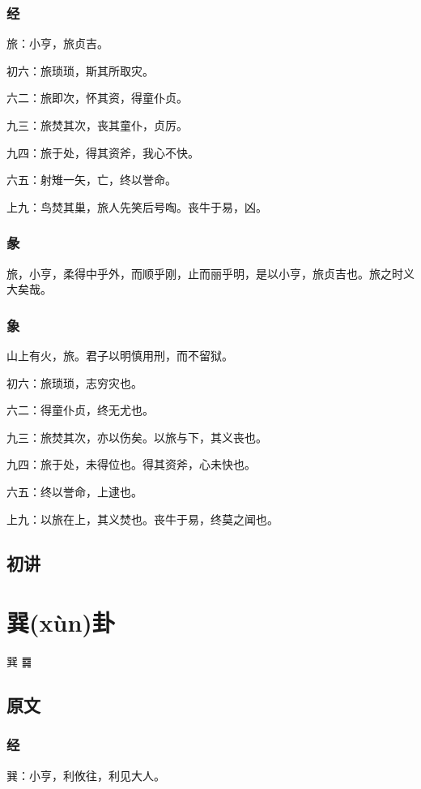\documentclass[12pt,oneside]{book}
\begin{document}
\subsection{经}
旅：小亨，旅贞吉。

初六：旅琐琐，斯其所取灾。

六二：旅即次，怀其资，得童仆贞。

九三：旅焚其次，丧其童仆，贞厉。

九四：旅于处，得其资斧，我心不快。

六五：射雉一矢，亡，终以誉命。

上九：鸟焚其巢，旅人先笑后号啕。丧牛于易，凶。

\subsection{彖}
旅，小亨，柔得中乎外，而顺乎刚，止而丽乎明，是以小亨，旅贞吉也。旅之时义大矣哉。

\subsection{象}
山上有火，旅。君子以明慎用刑，而不留狱。

初六：旅琐琐，志穷灾也。

六二：得童仆贞，终无尤也。

九三：旅焚其次，亦以伤矣。以旅与下，其义丧也。

九四：旅于处，未得位也。得其资斧，心未快也。

六五：终以誉命，上逮也。

上九：以旅在上，其义焚也。丧牛于易，终莫之闻也。

\section{初讲}


\chapter{巽(xùn)卦}
巽 {\Large ䷸}

\section{原文}

\subsection{经}
巽：小亨，利攸往，利见大人。
\end{document}
